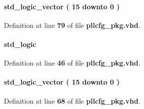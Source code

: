 \paragraph[{auto\+\_\+phcfg\+\_\+step}]{ {\bfseries \textcolor{comment}{std\+\_\+logic\+\_\+vector}\textcolor{vhdlchar}{ }\textcolor{vhdlchar}{(}\textcolor{vhdlchar}{ }\textcolor{vhdlchar}{ } \textcolor{vhdldigit}{15} \textcolor{vhdlchar}{ }\textcolor{keywordflow}{downto}\textcolor{vhdlchar}{ }\textcolor{vhdlchar}{ } \textcolor{vhdldigit}{0} \textcolor{vhdlchar}{ }\textcolor{vhdlchar}{)}\textcolor{vhdlchar}{ }} \hspace{0.3cm}{\ttfamily [Record]}}\label{classpllcfg__pkg_a7f15718519f52aaa84529cdecba6fd01}


Definition at line {\bf 79} of file {\bf pllcfg\+\_\+pkg.\+vhd}.

\paragraph[{c0\+\_\+byp}]{ {\bfseries \textcolor{comment}{std\+\_\+logic}\textcolor{vhdlchar}{ }} \hspace{0.3cm}{\ttfamily [Record]}}\label{classpllcfg__pkg_ad7fd646ca551430454786ce1d6040f43}


Definition at line {\bf 46} of file {\bf pllcfg\+\_\+pkg.\+vhd}.

\paragraph[{c0\+\_\+cnt}]{ {\bfseries \textcolor{comment}{std\+\_\+logic\+\_\+vector}\textcolor{vhdlchar}{ }\textcolor{vhdlchar}{(}\textcolor{vhdlchar}{ }\textcolor{vhdlchar}{ } \textcolor{vhdldigit}{15} \textcolor{vhdlchar}{ }\textcolor{keywordflow}{downto}\textcolor{vhdlchar}{ }\textcolor{vhdlchar}{ } \textcolor{vhdldigit}{0} \textcolor{vhdlchar}{ }\textcolor{vhdlchar}{)}\textcolor{vhdlchar}{ }} \hspace{0.3cm}{\ttfamily [Record]}}\label{classpllcfg__pkg_adf61dd781fe29b65462ce779c7cbaf92}


Definition at line {\bf 68} of file {\bf pllcfg\+\_\+pkg.\+vhd}.

